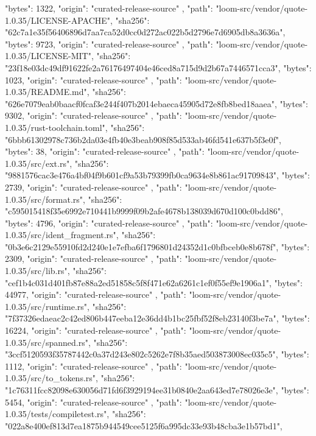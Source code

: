 {{      "bytes": 1322,
      "origin": "curated-release-source"
    },
    {
      "path": "loom-src/vendor/quote-1.0.35/LICENSE-APACHE",
      "sha256": "62c7a1e35f56406896d7aa7ca52d0cc0d272ac022b5d2796e7d6905db8a3636a",
      "bytes": 9723,
      "origin": "curated-release-source"
    },
    {
      "path": "loom-src/vendor/quote-1.0.35/LICENSE-MIT",
      "sha256": "23f18e03dc49df91622fe2a76176497404e46ced8a715d9d2b67a7446571cca3",
      "bytes": 1023,
      "origin": "curated-release-source"
    },
    {
      "path": "loom-src/vendor/quote-1.0.35/README.md",
      "sha256": "626e7079eab0baacf0fcaf3e244f407b2014ebaeca45905d72e8fb8bed18aaea",
      "bytes": 9302,
      "origin": "curated-release-source"
    },
    {
      "path": "loom-src/vendor/quote-1.0.35/rust-toolchain.toml",
      "sha256": "6bbb61302978c736b2da03e4fb40e3beab908f85d533ab46fd541e637b5f3e0f",
      "bytes": 38,
      "origin": "curated-release-source"
    },
    {
      "path": "loom-src/vendor/quote-1.0.35/src/ext.rs",
      "sha256": "9881576cac3e476a4bf04f9b601cf9a53b79399fb0ca9634e8b861ac91709843",
      "bytes": 2739,
      "origin": "curated-release-source"
    },
    {
      "path": "loom-src/vendor/quote-1.0.35/src/format.rs",
      "sha256": "c595015418f35e6992e710441b9999f09b2afe4678b138039d670d100c0bdd86",
      "bytes": 4796,
      "origin": "curated-release-source"
    },
    {
      "path": "loom-src/vendor/quote-1.0.35/src/ident_fragment.rs",
      "sha256": "0b3e6c2129e55910fd2d240e1e7efba6f1796801d24352d1c0bfbceb0e8b678f",
      "bytes": 2309,
      "origin": "curated-release-source"
    },
    {
      "path": "loom-src/vendor/quote-1.0.35/src/lib.rs",
      "sha256": "cef1b4c031d401fb87e88a2ed51858c5f8f471e62a6261c1ef0f55ef9e1906a1",
      "bytes": 44977,
      "origin": "curated-release-source"
    },
    {
      "path": "loom-src/vendor/quote-1.0.35/src/runtime.rs",
      "sha256": "7f37326edaeac2c42ed806b447eeba12e36dd4b1bc25fbf52f8eb23140f3be7a",
      "bytes": 16224,
      "origin": "curated-release-source"
    },
    {
      "path": "loom-src/vendor/quote-1.0.35/src/spanned.rs",
      "sha256": "3ccf5120593f35787442c0a37d243e802c5262e7f8b35aed503873008ec035c5",
      "bytes": 1112,
      "origin": "curated-release-source"
    },
    {
      "path": "loom-src/vendor/quote-1.0.35/src/to_tokens.rs",
      "sha256": "1c76311fcc82098e630056d71fd6f3929194ee31b0840e2aa643ed7e78026e3e",
      "bytes": 5454,
      "origin": "curated-release-source"
    },
    {
      "path": "loom-src/vendor/quote-1.0.35/tests/compiletest.rs",
      "sha256": "022a8e400ef813d7ea1875b944549cee5125f6a995dc33e93b48cba3e1b57bd1",
}}
